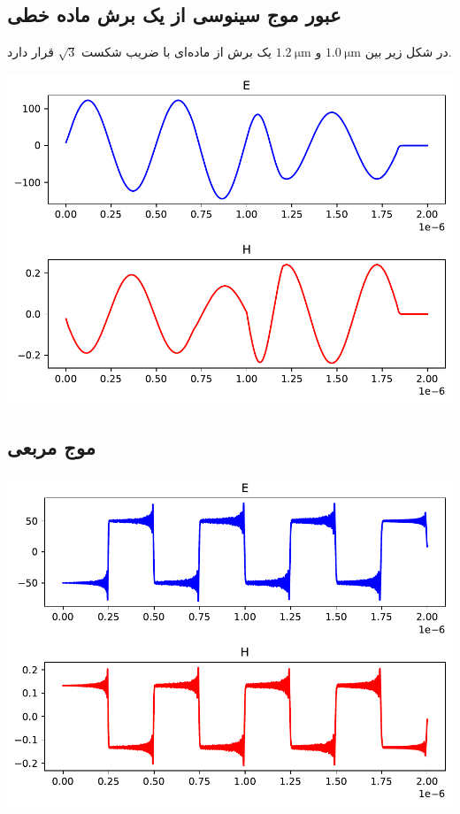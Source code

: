 \documentclass[12pt,a4paper]{article}
\begin{document}
	\subsection{عبور موج سینوسی از یک برش ماده خطی}
	در شکل زیر بین $\SI{1.0}{\micro\meter}$ و $\SI{1.2}{\micro\meter} $ یک برش از ماده‌ای با ضریب شکست $\sqrt{3}$ قرار دارد.
	\begin{center}
		\includegraphics{slab}
	\end{center}
	\subsection{موج مربعی}
	\begin{center}
		\includegraphics{rect}
	\end{center}
\end{document}
